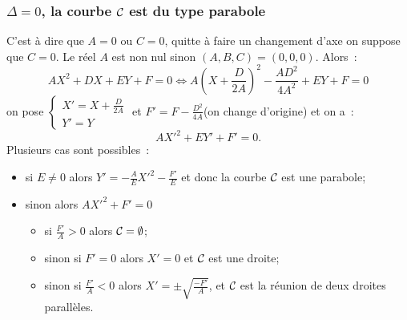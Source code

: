 \subsubsection{$\Delta=0$, la courbe $\mathcal{C}_{}$ est du type parabole}
C'est à dire que $A=0$ ou $C=0$, quitte à faire un changement d'axe on suppose que $C=0$. Le réel $A$ est non nul sinon $(A,B,C)=(0,0,0)$. Alors~:
\begin{equation}
  AX^2+DX+EY+F=0 \iff A\left(X+\frac{D}{2A}\right)^2-\frac{AD^2}{4A^2}+EY+F=0
\end{equation}
on pose $\begin{cases}X'=X+\frac{D}{2A} \\ Y'=Y\end{cases}$ et $F'=F-\frac{D^2}{4A}$(on change d'origine) et on a~:
\begin{equation}
  AX'^2+EY'+F'=0.
\end{equation}
Plusieurs cas sont possibles~:
\begin{itemize}
\item si $E \neq 0$ alors $Y'=-\frac{A}{E}X'^2-\frac{F'}{E}$ et donc la courbe $\mathcal{C}_{}$ est une parabole;
\item sinon alors $AX'^2+F'=0$
  \begin{itemize}
  \item si $\frac{F'}{A}>0$ alors $\mathcal{C}_{}=\emptyset$;
  \item sinon si $F'=0$ alors $X'=0$ et $\mathcal{C}_{}$ est une droite;
  \item sinon si $\frac{F'}{A}<0$ alors $X'=\pm \sqrt{\frac{-F'}{A}}$, et $\mathcal{C}_{}$ est la réunion de deux droites parallèles.
  \end{itemize}
\end{itemize}

